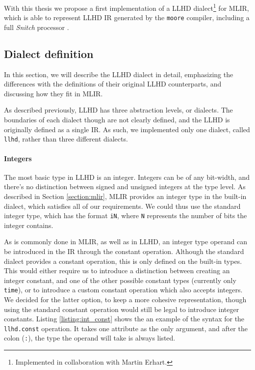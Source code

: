 With this thesis we propose a first implementation of a LLHD dialect\footnote{Implemented in collaboration with Martin Erhart.} for MLIR, which is able to represent LLHD IR generated by the \texttt{moore} compiler, including a full \textit{Snitch} processor \cite{Zaruba2020}.



\subsection{Dialect definition}
In this section, we will describe the LLHD dialect in detail, emphasizing the differences with the definitions of their original LLHD counterparts, and discussing how they fit in MLIR.

As described previously, LLHD has three abstraction levels, or dialects. The boundaries of each dialect though are not clearly defined, and the LLHD is originally defined as a single IR. As such, we implemented only one dialect, called \texttt{llhd}, rather than three different dialects.

\paragraph{Integers}
The most basic type in LLHD is an integer. Integers can be of any bit-width, and there's no distinction between signed and unsigned integers at the type level. As described in Section \ref{section:mlir}, MLIR provides an integer type in the built-in dialect, which satisfies all of our requirements. We could thus use the standard integer type, which has the format \texttt{iN}, where \texttt{N} represents the number of bits the integer contains.

As is commonly done in MLIR, as well as in LLHD, an integer type operand can be introduced in the IR through the constant operation. Although the standard dialect provides a constant operation, this is only defined on the built-in types. This would either require us to introduce a distinction between creating an integer constant, and one of the other possible constant types (currently only \texttt{time}), or to introduce a custom constant operation which also accepts integers. We decided for the latter option, to keep a more cohesive representation, though using the standard constant operation would still be legal to introduce integer constants. Listing \ref{listing:int_const} shows the an example of the syntax for the \texttt{llhd.const} operation. It takes one attribute as the only argument, and after the colon (\texttt{:}), the type the operand will take is always listed.

